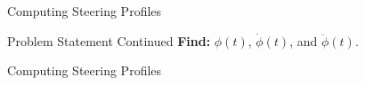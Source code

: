 \documentclass{beamer}
\begin{document}
\begin{frame}{Computing Steering Profiles}
\begin{block}{ Problem Statement Continued}
{\bf Find:} $\phi(t)$, $\dot{\phi}(t)$, and $\ddot{\phi}(t)$.
\end{block}
\end{frame}

\begin{frame}{Computing Steering Profiles}


\end{frame}
\end{document}
